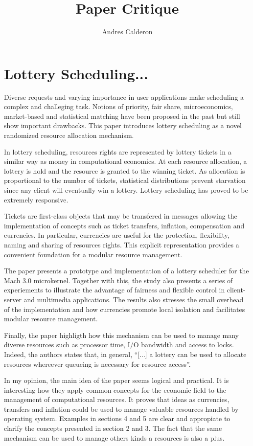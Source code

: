 \documentclass[a4paper,10pt]{scrartcl}
\title{Paper Critique}
\author{Andres Calderon}
\begin{document}
\maketitle

\section*{Lottery Scheduling...}
Diverse requests and varying importance in user applications make scheduling a complex and challeging task. Notions of priority, fair share, microeconomics, market-based and statistical matching have been proposed in the past but still show important drawbacks. This paper introduces lottery scheduling as a novel randomized resource allocation mechanism.

In lottery scheduling, resources rights  are represented by lottery tickets in a similar way as money in computational economics. At each resource allocation, a lottery is hold and the resource is granted to the winning ticket. As allocation is proportional to the number of tickets, statistical distributions prevent starvation since any client will eventually win a lottery.  Lottery scheduling has proved to be extremely responsive.

Tickets are first-class objects that may be transfered in messages allowing the implementation of concepts such as ticket transfers, inflation, compensation and currencies. In particular, currencies are useful for the protection, flexibility, naming and sharing of resources rights. This explicit representation provides a convenient foundation for a modular resource management.

The paper presents a prototype and implementation of a lottery scheduler for the Mach 3.0 microkernel. Together with this, the study also presents a series of experiements to illustrate the advantage of fairness and flexible control in client-server and multimedia applications.  The results also stresses the small overhead of the implementation and how currencies promote local isolation and facilitates modular resource management.  

Finally, the paper highligth how this mechanism can be used to manage many diverse resources such as processor time, I/O bandwidth and access to locks.  Indeed, the authors states that, in general, ``[...] a lottery can be used to allocate resources whereever queueing is necessary for resource access''.

In my opinion, the main idea of the paper seems logical and practical.  It is interesting how they apply common concepts for the economic field to the management of computational resources.  It proves that ideas as currencies, transfers and inflation could be used to manage valuable resources handled by operating system.  Examples in sections 4 and 5 are clear and appropiate to clarify the concepts presented in section 2 and 3.  The fact that the same mechanism can be used to manage others kinds a resources is also a plus.  
\end{document}
